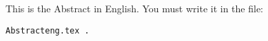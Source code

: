﻿%

\bigskip  %

This is the Abstract in English. You must write it in the file: 

\vspace{0.5in}

\begin{center}
	\begin{verbatim}Abstracteng.tex .
	\end{verbatim}
\end{center}

